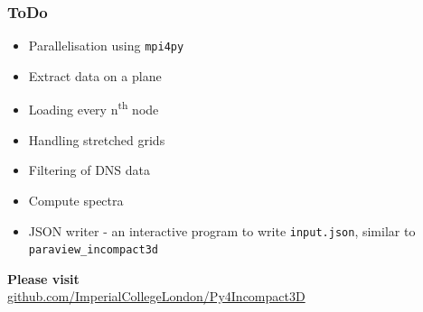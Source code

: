 \documentclass{beamer}
\begin{document}
\begin{frame}
  \frametitle{ToDo}

  \centering

  \begin{itemize}
  \item Parallelisation using \texttt{mpi4py}
  \item Extract data on a plane
  \item Loading every n\textsuperscript{th} node
  \item Handling stretched grids
  \item Filtering of DNS data
  \item Compute spectra
  \item JSON writer - an interactive program to write \texttt{input.json}, similar to
    \texttt{paraview\_incompact3d}
  \end{itemize}
  
  \textbf{Please visit}\\
  \url{github.com/ImperialCollegeLondon/Py4Incompact3D}
\end{frame}
\end{document}
